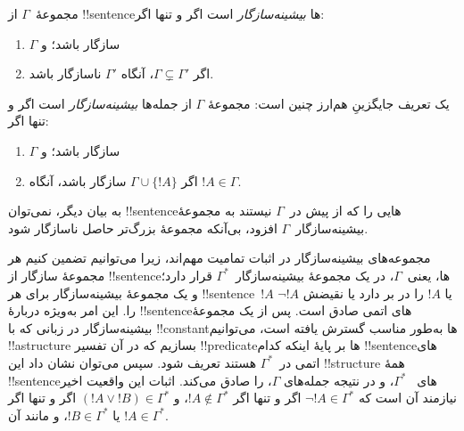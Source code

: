 \documentclass[../../../include/open-logic-section]{subfiles}
\begin{document}

\begin{defn}
مجموعهٔ~$\Gamma$ از !!{sentence}ها \emph{بیشینه‌سازگار} است اگر و تنها
اگر:
\begin{enumerate}
\item $\Gamma$ سازگار باشد؛ و
\item اگر $\Gamma \subsetneq \Gamma'$، آنگاه $\Gamma'$ ناسازگار باشد.
\end{enumerate}
\end{defn}

\begin{explain}
یک تعریف جایگزینِ هم‌ارز چنین است: مجموعهٔ $\Gamma$ از جمله‌ها
\emph{بیشینه‌سازگار} است اگر و تنها اگر:
\begin{enumerate}
\item $\Gamma$ سازگار باشد؛ و
\item اگر $\Gamma \cup \{ !A \}$ سازگار باشد، آنگاه $!A \in \Gamma$.
\end{enumerate}
به بیان دیگر، نمی‌توان !!{sentence}هایی را که از پیش در~$\Gamma$
نیستند به مجموعهٔ بیشینه‌سازگار~$\Gamma$ افزود، بی‌آنکه مجموعهٔ
بزرگ‌تر حاصل ناسازگار شود.
\end{explain}

\begin{explain}
مجموعه‌های بیشینه‌سازگار در اثبات تمامیت مهم‌اند، زیرا می‌توانیم تضمین
کنیم هر مجموعهٔ سازگار از !!{sentence}ها، یعنی~$\Gamma$، در یک مجموعهٔ
بیشینه‌سازگار~$\Gamma^*$ قرار دارد؛ و یک مجموعهٔ بیشینه‌سازگار برای هر
!!{sentence}~$!A$ یا $!A$ را در بر دارد یا نقیضش $\lnot !A$ را. این
امر به‌ویژه دربارهٔ !!{sentence}های اتمی صادق است. پس از یک مجموعهٔ
بیشینه‌سازگار در زبانی که با !!{constant}ها به‌طور مناسب گسترش یافته
است، می‌توانیم !!a{structure} بسازیم که در آن تفسیر !!{predicate}ها بر
پایهٔ اینکه کدام !!{sentence}های اتمی در~$\Gamma^*$ هستند تعریف شود.
سپس می‌توان نشان داد این !!{structure} همهٔ !!{sentence}های
~$\Gamma^*$، و در نتیجه جمله‌های $\Gamma$، را صادق می‌کند. اثبات این
واقعیت اخیر نیازمند آن است که $\lnot !A \in \Gamma^*$ اگر و تنها اگر
$!A \notin \Gamma^*$، و $(!A \lor !B) \in \Gamma^*$ اگر و تنها اگر
$!A \in \Gamma^*$ یا $!B \in \Gamma^*$، و مانند آن.
\end{explain}
\end{document}
